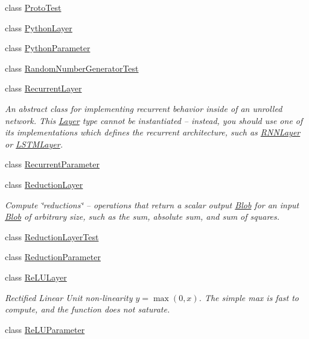 \begin{DoxyCompactItemize}
class \mbox{\hyperlink{classcaffe_1_1_proto_test}{Proto\+Test}}
\item 
class \mbox{\hyperlink{classcaffe_1_1_python_layer}{Python\+Layer}}
\item 
class \mbox{\hyperlink{classcaffe_1_1_python_parameter}{Python\+Parameter}}
\item 
class \mbox{\hyperlink{classcaffe_1_1_random_number_generator_test}{Random\+Number\+Generator\+Test}}
\item 
class \mbox{\hyperlink{classcaffe_1_1_recurrent_layer}{Recurrent\+Layer}}
\begin{DoxyCompactList}\small\item\em An abstract class for implementing recurrent behavior inside of an unrolled network. This \mbox{\hyperlink{classcaffe_1_1_layer}{Layer}} type cannot be instantiated -- instead, you should use one of its implementations which defines the recurrent architecture, such as \mbox{\hyperlink{classcaffe_1_1_r_n_n_layer}{R\+N\+N\+Layer}} or \mbox{\hyperlink{classcaffe_1_1_l_s_t_m_layer}{L\+S\+T\+M\+Layer}}. \end{DoxyCompactList}\item 
class \mbox{\hyperlink{classcaffe_1_1_recurrent_parameter}{Recurrent\+Parameter}}
\item 
class \mbox{\hyperlink{classcaffe_1_1_reduction_layer}{Reduction\+Layer}}
\begin{DoxyCompactList}\small\item\em Compute \char`\"{}reductions\char`\"{} -- operations that return a scalar output \mbox{\hyperlink{classcaffe_1_1_blob}{Blob}} for an input \mbox{\hyperlink{classcaffe_1_1_blob}{Blob}} of arbitrary size, such as the sum, absolute sum, and sum of squares. \end{DoxyCompactList}\item 
class \mbox{\hyperlink{classcaffe_1_1_reduction_layer_test}{Reduction\+Layer\+Test}}
\item 
class \mbox{\hyperlink{classcaffe_1_1_reduction_parameter}{Reduction\+Parameter}}
\item 
class \mbox{\hyperlink{classcaffe_1_1_re_l_u_layer}{Re\+L\+U\+Layer}}
\begin{DoxyCompactList}\small\item\em Rectified Linear Unit non-\/linearity $ y = \max(0, x) $. The simple max is fast to compute, and the function does not saturate. \end{DoxyCompactList}\item 
class \mbox{\hyperlink{classcaffe_1_1_re_l_u_parameter}{Re\+L\+U\+Parameter}}

\end{DoxyCompactItemize}
